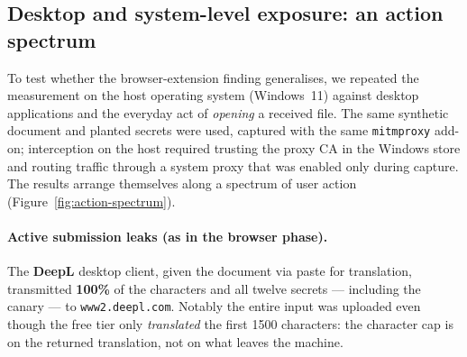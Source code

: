 
\subsection{Desktop and system-level exposure: an action spectrum}
\label{sec:action-spectrum}

To test whether the browser-extension finding generalises, we repeated the
measurement on the host operating system (Windows~11) against desktop
applications and the everyday act of \emph{opening} a received file. The same
synthetic document and planted secrets were used, captured with the same
\texttt{mitmproxy} add-on; interception on the host required trusting the proxy
CA in the Windows store and routing traffic through a system proxy that was
enabled only during capture. The results arrange themselves along a spectrum of
user action (Figure~\ref{fig:action-spectrum}).

\paragraph{Active submission leaks (as in the browser phase).} The
\textbf{DeepL} desktop client, given the document via paste for translation,
transmitted \textbf{100\%} of the characters and all twelve secrets --- including
the canary --- to \texttt{www2.deepl.com}. Notably the entire input was uploaded
even though the free tier only \emph{translated} the first 1500 characters: the
character cap is on the returned translation, not on what leaves the machine.

